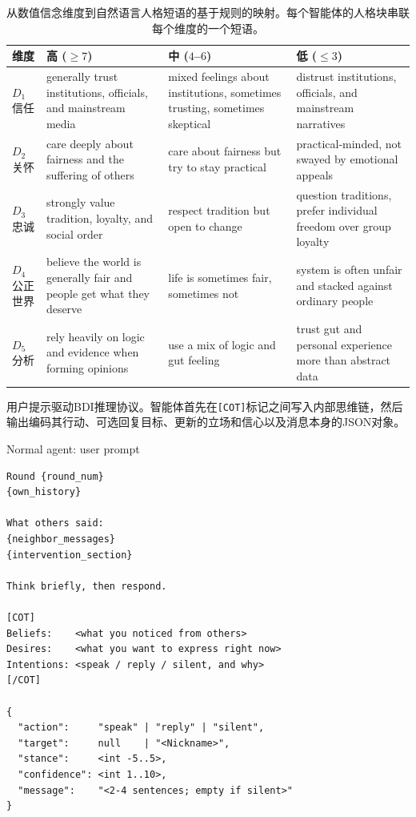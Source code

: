 \begin{table}[!htbp]
\centering
\small
\renewcommand{\arraystretch}{1.15}
\caption{从数值信念维度到自然语言人格短语的基于规则的映射。每个智能体的人格块串联每个维度的一个短语。}
\label{tab:personality_mapping}
\setlength{\tabcolsep}{4pt}
\begin{tabular}{@{}l p{} p{} p{}@{}}
\toprule
\textbf{维度} & \textbf{高 ($\geq 7$)} & \textbf{中 ($4$--$6$)} & \textbf{低 ($\leq 3$)} \\
\midrule
$D_1$ 信任 & generally trust institutions, officials, and mainstream media & mixed feelings about institutions, sometimes trusting, sometimes skeptical & distrust institutions, officials, and mainstream narratives \\
$D_2$ 关怀 & care deeply about fairness and the suffering of others & care about fairness but try to stay practical & practical-minded, not swayed by emotional appeals \\
$D_3$ 忠诚 & strongly value tradition, loyalty, and social order & respect tradition but open to change & question traditions, prefer individual freedom over group loyalty \\
$D_4$ 公正世界 & believe the world is generally fair and people get what they deserve & life is sometimes fair, sometimes not & system is often unfair and stacked against ordinary people \\
$D_5$ 分析 & rely heavily on logic and evidence when forming opinions & use a mix of logic and gut feeling & trust gut and personal experience more than abstract data \\
\bottomrule
\end{tabular}
\end{table}

用户提示驱动BDI推理协议。智能体首先在\texttt{[COT]}标记之间写入内部思维链，然后输出编码其行动、可选回复目标、更新的立场和信心以及消息本身的JSON对象。

\begin{npromptbox}{Normal agent: user prompt}
\begin{verbatim}
Round {round_num}
{own_history}

What others said:
{neighbor_messages}
{intervention_section}

Think briefly, then respond.

[COT]
Beliefs:    <what you noticed from others>
Desires:    <what you want to express right now>
Intentions: <speak / reply / silent, and why>
[/COT]

{
  "action":     "speak" | "reply" | "silent",
  "target":     null    | "<Nickname>",
  "stance":     <int -5..5>,
  "confidence": <int 1..10>,
  "message":    "<2-4 sentences; empty if silent>"
}
\end{verbatim}
\end{npromptbox}

